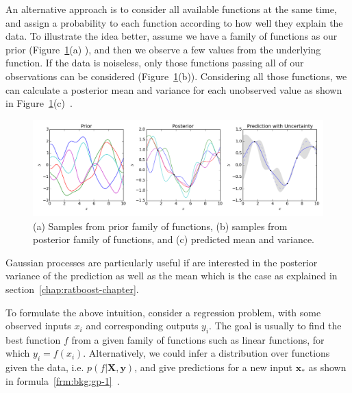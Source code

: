An alternative approach is to consider all available functions at the same time, and assign a probability to each function according to how well they explain the data. To illustrate the idea better, assume we have a family of functions as our prior (Figure~\ref{fig:bkg:gp-intro}(a)  ), and then we observe a few values from the underlying function. If the data is noiseless, only those functions passing all of our observations can be considered (Figure~\ref{fig:bkg:gp-intro}(b)). Considering all those functions, we can calculate a posterior mean and variance for each unobserved value as shown in Figure~\ref{fig:bkg:gp-intro}(c)~\cite{gaussian-processes}.

\begin{figure}[!ht]
  \centering
  \includegraphics[width=1\textwidth]{figs/background/Gaussian_Process_Regression}
  \caption[(a) Samples from prior family of functions, (b) samples from posterior family of functions, and (c) predicted mean and variance]{(a) Samples from prior family of functions, (b) samples from posterior family of functions, and (c) predicted mean and variance\protect\footnotemark.}
  \label{fig:bkg:gp-intro}
\end{figure}

Gaussian processes are particularly useful if are interested in the posterior variance of the prediction as well as the mean which is the case as explained in section~\ref{chap:ratboost-chapter}.

To formulate the above intuition, consider a regression problem, with some observed inputs $x_i$ and corresponding outputs $y_i$. The goal is usually to find the best function $f$ from a given family of functions such as linear functions, for which $y_i = f(x_i)$. Alternatively, we could infer a distribution over functions given the data, i.e. $p(f|\mathbf{X}, \mathbf{y})$, and give predictions for a new input $\mathbf{x}_*$ as shown in formula~\ref{frm:bkg:gp-1}~\cite{murphy2012machine}.

